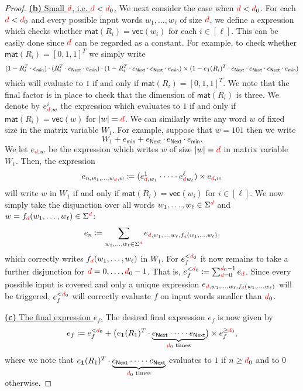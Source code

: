 \begin{proof}
\medskip
\noindent
\underline{\textbf{(b)} Small ${\color{red} d}$, i.e. ${\color{red} d}< {\color{red} d}_0$.}	
We next consider the case when ${\color{red} d}<{\color{red} d}_0$. For each ${\color{red} d}<{\color{red} d}_0$ and every possible input words
    $w_1,\ldots,w_\ell$ of size ${\color{red} d}$, we define a \langfor expression which checks whether
    $\mathsf{mat}(R_i)=\mathsf{vec}(w_i)$ for each $i\in[\ell]$. This can be easily done since ${\color{red} d}$ 
    can be regarded as a constant. For example, to check whether $\mathsf{mat}(R_i)=[0,1,1]^T$ we simply write
    $$
    (1- R_i^T\cdot e_{\mathsf{min}})\cdot (R_i^T\cdot e_{\mathsf{Next}}\cdot e_{\mathsf{min}})\cdot (1- R_i^T\cdot e_{\mathsf{Next}}\cdot e_{\mathsf{Next}}\cdot e_{\mathsf{min}})\times (1- e_{\mathbf{1}}(R_i)^T\cdot e_{\mathsf{Next}}\cdot e_{\mathsf{Next}}\cdot e_{\mathsf{Next}}\cdot e_{\mathsf{min}})
    $$
    which will evaluate to $1$ if and only if $\mathsf{mat}(R_i)=[0,1,1]^T$. We note that the final factor is in 
    place to check that the dimension of $\mathsf{mat}(R_i)$ is three.
    We denote by
    $e_{{\color{red} d},w}^i$ the expression which evaluates to $1$ if and only if $\mathsf{mat}(R_i)=\mathsf{vec}(w)$
    for $|w|={\color{red} d}$.
    We can similarly
    write any word $w$ of fixed size in the matrix variable $W_1$. For example, suppose that $w=101$
    then we write 
    $$
    W_1+ e_{\mathsf{min}}+  e_{\mathsf{Next}}\cdot e_{\mathsf{Next}}\cdot e_{\mathsf{min}}.
    $$
    We let $e_{{\color{red} d},w}$ be the expression which writes $w$ of size $|w|={\color{red} d}$ in matrix variable $W_1$.
    Then, the expression
    $$
    e_{n,w_1,\ldots,w_{\color{red} d},w}\coloneqq (e_{{\color{red} d},w_1}^1\cdot\cdots\cdot e_{{\color{red} d}w_{\ell}}^\ell)\times e_{{\color{red} d},w}
    $$
    will write $w$ in $W_1$ if and only if $\mathsf{mat}(R_i)=\mathsf{vec}(w_i)$ for $i\in[\ell]$.
    We now simply take the disjunction over all words 
    $w_1,\ldots,w_\ell\in\Sigma^{\color{red} d}$ and $w=f_{\color{red} d}(w_1,\ldots,w_\ell)\in\Sigma^{\color{red} d}$:
    $$
    e_n\coloneqq \sum_{w_1,\ldots,w_\ell\in\Sigma^{\color{red} d}} e_{{\color{red} d},w_1,\ldots,w_\ell,f_{\color{red} d}(w_1,\ldots,w_\ell)},
    $$
    which correctly writes $f_{\color{red} d}(w_1,\ldots,w_\ell)$ in $W_1$. For $e_f^{<{\color{red} d}_0}$ it now remains
to take a further disjunction for ${\color{red} d}=0,\ldots, {\color{red} d}_0-1$. That is,
    $
    e_f^{<{\color{red} d}_0}\coloneqq \sum_{{\color{red} d}=0}^{{\color{red} d}_0-1} e_{\color{red} d}
    $.
    Since every possible input is covered and only a unique expression 
    $e_{{\color{red} d},w_1,\ldots,w_\ell,f_{\color{red} d}(w_1,\ldots,w_\ell)}$ will be triggered, $e_f^{<{\color{red} d}_0}$ will correctly
    evaluate $f$ on input words smaller than ${\color{red} d}_0$.

\medskip
\noindent
\underline{\textbf{(c)} The final expression $e_f$.}	
 The desired final expression $e_f$ is now given by
    $$
    e_f\coloneqq e_f^{<{\color{red} d}_0} + \bigl(e_{\mathbf{1}}(R_1)^T\cdot\underbrace{e_{\mathsf{Next}}\cdot\cdots\cdot e_{\mathsf{Next}}}_{\text{${\color{red} d}_0$ times}}\bigr)\times e_f^{\geq {\color{red} d}_0},
    $$
where we note that $e_{\mathbf{1}}(R_1)^T\cdot\underbrace{e_{\mathsf{Next}}\cdot\cdots\cdot e_{\mathsf{Next}}}_{\text{${\color{red} d}_0$ times}}$ evaluates to $1$ if
$n\geq {\color{red} d}_0$ and to $0$ otherwise.
\end{proof}

